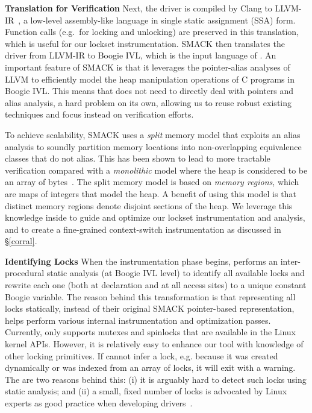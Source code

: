 \noindent\textbf{Translation for Verification }
%
Next, the driver is compiled by Clang to LLVM-IR~\cite{lattner2004llvm}, a low-level assembly-like language in single static assignment (SSA) form. Function calls (e.g.\ for locking and unlocking) are preserved in this translation, which is useful for our lockset instrumentation.
%
SMACK then translates the driver from LLVM-IR to Boogie IVL, which is the input language of \whoop. An important feature of SMACK is that it leverages the pointer-alias analyses of LLVM to efficiently model the heap manipulation operations of C programs in Boogie IVL. This means that \whoop does not need to directly deal with pointers and alias analysis, a hard problem on its own, allowing us to reuse robust existing techniques and focus instead on verification efforts.

To achieve scalability, SMACK uses a \emph{split} memory model that exploits an alias analysis to soundly partition memory locations into non-overlapping equivalence classes that do not alias. This has been shown to lead to more tractable verification compared with a \emph{monolithic} model where the heap is considered to be an array of bytes~\cite{rakamaric2009scalable}. The split memory model is based on \emph{memory regions}, which are maps of integers that model the heap. A benefit of using this model is that distinct memory regions denote disjoint sections of the heap. We leverage this knowledge inside \whoop to guide and optimize our lockset instrumentation and analysis, and to create a fine-grained context-switch instrumentation as discussed in \S\ref{corral}.

\noindent\textbf{Identifying Locks }
%
When the instrumentation phase begins, \whoop performs an inter-procedural static analysis (at Boogie IVL level) to identify all available locks and rewrite each one (both at declaration and at all access sites) to a unique constant Boogie variable. The reason behind this transformation is that representing all locks statically, instead of their original SMACK pointer-based representation, helps \whoop perform various internal instrumentation and optimization passes.
%
Currently, \whoop only supports mutexes and spinlocks that are available in the Linux kernel APIs. However, it is relatively easy to enhance our tool with knowledge of other locking primitives. If \whoop cannot infer a lock, e.g. because it was created dynamically or was indexed from an array of locks, it will exit with a warning. The are two reasons behind this: (i) it is arguably hard to detect such locks using static analysis; and (ii) a small, fixed number of locks is advocated by Linux experts as good practice when developing drivers~\cite{corbet2005linux}.


